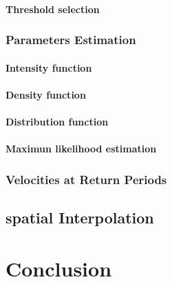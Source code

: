 \documentclass[12pt,twoside]{reedthesis}
\begin{document}
\hypertarget{threshold-selection}{%
\subsubsection{Threshold selection}\label{threshold-selection}}

\hypertarget{parameters-estimation}{%
\subsection{Parameters Estimation}\label{parameters-estimation}}

\hypertarget{intensity-function}{%
\subsubsection{Intensity function}\label{intensity-function}}

\hypertarget{density-function}{%
\subsubsection{Density function}\label{density-function}}

\hypertarget{distribution-function}{%
\subsubsection{Distribution function}\label{distribution-function}}

\hypertarget{maximun-likelihood-estimation}{%
\subsubsection{Maximun likelihood estimation}\label{maximun-likelihood-estimation}}

\hypertarget{velocities-at-return-periods}{%
\subsection{Velocities at Return Periods}\label{velocities-at-return-periods}}

\hypertarget{spatial-interpolation}{%
\section{spatial Interpolation}\label{spatial-interpolation}}

\hypertarget{conclusion}{%
\chapter*{Conclusion}\label{conclusion}}
\end{document}
